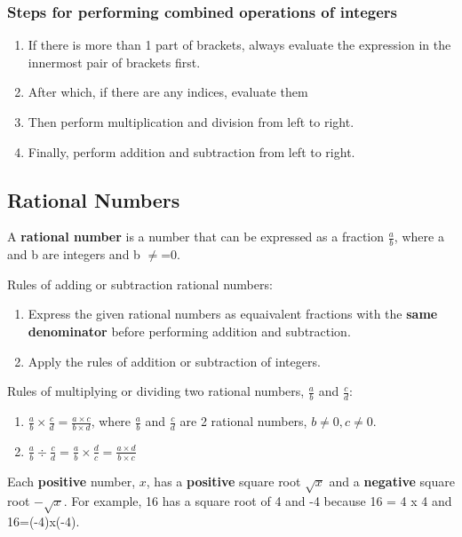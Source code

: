 \documentclass[../main]{subfiles}
\begin{document}
\subsubsection{Steps for performing combined operations of integers}
\begin{enumerate}
\item If there is more than 1 part of brackets, always evaluate the expression
  in the innermost pair of brackets first.
\item After which, if there are any indices, evaluate them
\item Then perform multiplication and division from left to right.
\item Finally, perform addition and subtraction from left to right.
\end{enumerate}

\subsection{Rational Numbers}

A \textbf{rational number} is a number that can be expressed as a fraction
\(\frac a b\), where a and b are integers and b \(\neq\)=0.

Rules of adding or subtraction rational numbers:
\begin{enumerate}
\item Express the given rational numbers as equaivalent fractions with the
  \textbf{same denominator} before performing addition and subtraction.
\item Apply the rules of addition or subtraction of integers.
\end{enumerate}


Rules of multiplying or dividing two rational numbers, \(\frac a b \) and
\(\frac c d\):

\begin{enumerate}
  \item \({\frac a b} \times {\frac c d} = {\frac {a \times c } {b \times d}}\),
    where \(\frac a b\) and \(\frac c d\) are 2 rational numbers, \(b \neq 0, c
    \neq 0\).
 \item \({\frac a b} \div {\frac c d } = {\frac a b } \times {\frac d c} =
   {\frac {a \times d} {b \times c}}\)
\end{enumerate}

Each \textbf{positive} number, \(x\), has a \textbf{positive} square root
\(\sqrt x\) and a \textbf{negative} square root \(- \sqrt x\). For example,
16 has a square root of 4 and -4 because 16 = 4 x 4 and 16=(-4)x(-4).  
\end{document}
